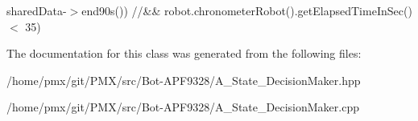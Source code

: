 shared\+Data-\/$>$end90s()) //\&\& robot.\+chronometer\+Robot().get\+Elapsed\+Time\+In\+Sec() $<$ 35) 

The documentation for this class was generated from the following files\+:\begin{DoxyCompactItemize}
\item 
/home/pmx/git/\+P\+M\+X/src/\+Bot-\/\+A\+P\+F9328/A\+\_\+\+State\+\_\+\+Decision\+Maker.\+hpp\item 
/home/pmx/git/\+P\+M\+X/src/\+Bot-\/\+A\+P\+F9328/A\+\_\+\+State\+\_\+\+Decision\+Maker.\+cpp\end{DoxyCompactItemize}
